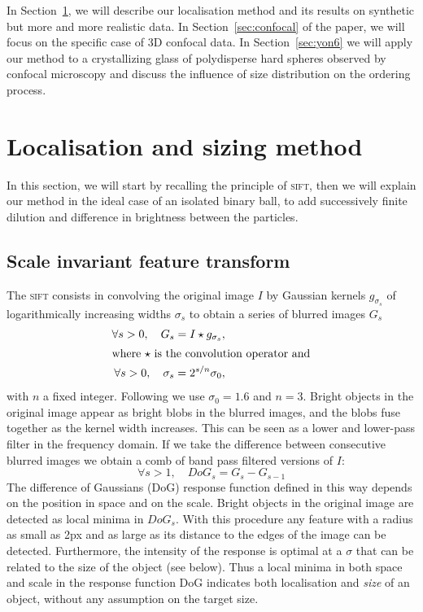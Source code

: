 \documentclass[8.5pt,twoside,twocolumn]{article}
\begin{document}
In Section~\ref{sec:method}, we will describe our localisation method and its results on synthetic but more and more realistic data. In Section~\ref{sec:confocal} of the paper, we will focus on the specific case of 3D confocal data. In Section~\ref{sec:yon6} we will apply our method to a crystallizing glass of polydisperse hard spheres observed by confocal microscopy and discuss the influence of size distribution on the ordering process.

\section{Localisation and sizing method}
\label{sec:method}

In this section, we will start by recalling the principle of \textsc{sift}, then we will explain our method in the ideal case of an isolated binary ball, to add successively finite dilution and difference in brightness between the particles.

\subsection{Scale invariant feature transform}
The \textsc{sift} consists in convolving the original image $I$ by Gaussian kernels $g_{\sigma_s}$ of logarithmically increasing widths $\sigma_s$ to obtain a series of blurred images $G_s$
\begin{align}
\forall s>0,\quad G_s = I \star g_{\sigma_s}, \label{eq:gaussian_blur}\\
\intertext{where $\star$ is the convolution operator and}
\forall s>0,\quad \sigma_{s} = 2^{s/n} \sigma_0 ,
\label{eq:sigma_s}
\end{align}
with $n$ a fixed integer. Following \cite{Lowe2004} we use $\sigma_0=1.6$ and $n=3$. Bright objects in the original image appear as bright blobs in the blurred images, and the blobs fuse together as the kernel width increases. This can be seen as a lower and lower-pass filter in the frequency domain. If we take the difference between consecutive blurred images we obtain a comb of band pass filtered versions of $I$: 
\begin{equation}
\forall s>1,\quad DoG_s = G_s - G_{s-1} \label{eq:DoG_s}
\end{equation}
The difference of Gaussians (DoG) response function defined in this way depends on the position in space and on the scale. Bright objects in the original image are detected as local minima in $DoG_s$. With this procedure any feature with a radius as small as \unit{2}{px} and as large as its distance to the edges of the image can be detected. Furthermore, the intensity of the response is optimal at a $\sigma$ that can be related to the size of the object (see below). Thus a local minima in both space and scale in the response function DoG indicates both localisation and \emph{size} of an object, without any assumption on the target size.
\end{document}
